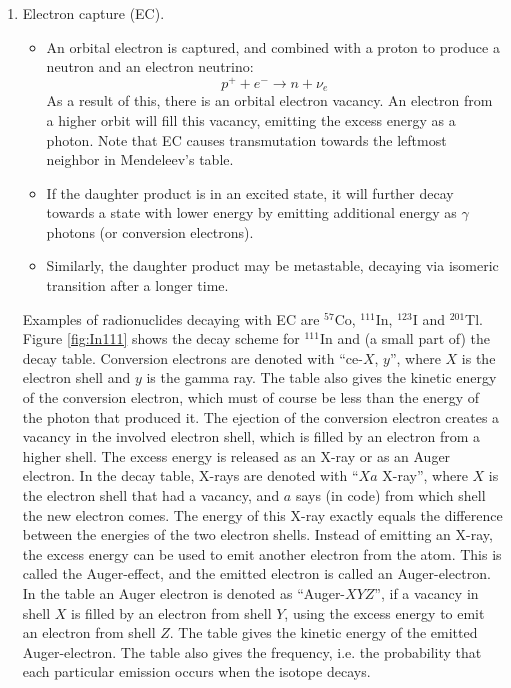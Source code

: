 \documentclass[11pt,oneside]{article}
\begin{document}
\begin{enumerate}
\item Electron capture (EC).
\begin{itemize}
\item An orbital electron is captured, and combined with a proton to produce a
neutron and an electron neutrino:
\begin{equation}
  p^+ + e^- \rightarrow n + \nu_e
\end{equation}
As a result of this, there is an orbital electron vacancy.  An electron from a
higher orbit will fill this vacancy, emitting the excess energy as a photon.
Note that EC causes transmutation towards the leftmost neighbor in
Mendeleev's table.

\item If the daughter product is in an excited state, it will further decay
towards a state with lower energy by emitting additional energy as $\gamma$
photons (or conversion electrons).

\item
Similarly, the daughter product may be metastable, decaying via isomeric
transition after a longer time.
\end{itemize}

Examples of radionuclides decaying with EC are $^{57}$Co, $^{111}$In,
$^{123}$I and $^{201}$Tl. Figure \ref{fig:In111} shows the decay
scheme for $^{111}$In and (a small part of) the decay
table. Conversion electrons are denoted with ``ce-$X$, $y$'', where
$X$ is the electron shell and $y$ is the gamma ray. The table also
gives the kinetic energy of the conversion electron, which must of
course be less than the energy of the photon that produced it. The
ejection of the conversion electron creates a vacancy in the involved
electron shell, which is filled by an electron from a higher
shell. The excess energy is released as an X-ray or as an Auger
electron. In the decay table, X-rays are denoted with ``$Xa$ X-ray'',
where $X$ is the electron shell that had a vacancy, and $a$ says (in
code) from which shell the new electron comes. The energy of this
X-ray exactly equals the difference between the energies of the two
electron shells.  Instead of emitting an X-ray, the excess energy can
be used to emit another electron from the atom. This is called the
Auger-effect, and the emitted electron is called an Auger-electron. In
the table an Auger electron is denoted as ``Auger-$XYZ$'', if a
vacancy in shell $X$ is filled by an electron from shell $Y$, using
the excess energy to emit an electron from shell $Z$. The table gives
the kinetic energy of the emitted Auger-electron. The table also gives
the frequency, i.e. the probability that each particular emission
occurs when the isotope decays.
%


\end{enumerate}
\end{document}
